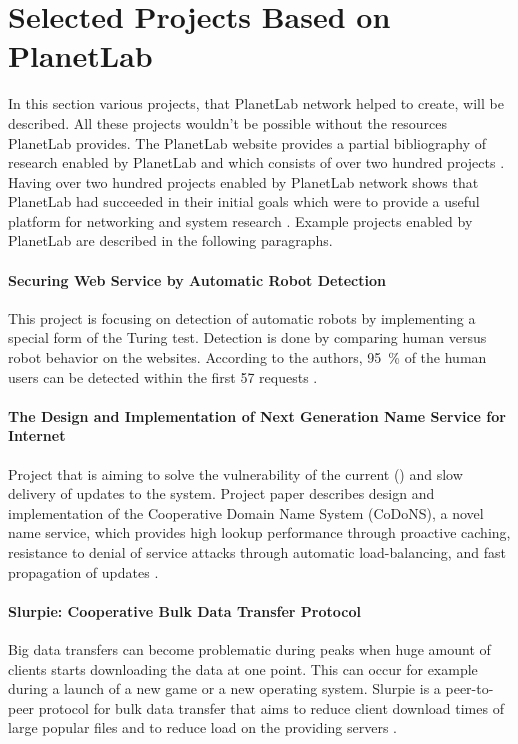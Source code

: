 \section{Selected Projects Based on PlanetLab}
In this section various projects, that PlanetLab network helped to create, will be described. All these projects wouldn't be possible without the resources PlanetLab provides. The PlanetLab website provides a partial bibliography of research enabled by PlanetLab and which consists of over two hundred projects \cite{planetlabmain}. Having over two hundred projects enabled by PlanetLab network shows that PlanetLab had succeeded in their initial goals which were to provide a useful platform for networking and system research \cite{Roscoe_PDN-02-002}. Example projects enabled by PlanetLab are described in the following paragraphs.
\paragraph{Securing Web Service by Automatic Robot Detection}
This project is focusing on detection of automatic robots by implementing a special form of the Turing test. Detection is done by comparing human versus robot behavior on the websites. According to the authors, \SI{95}{\percent} of the human users can be detected within the first 57 requests \cite{Park:2006:SWS:1267359.1267382}.
\paragraph{The Design and Implementation of Next Generation Name Service for Internet}
Project that is aiming to solve the vulnerability of the current  () and slow delivery of updates to the system. Project paper describes design and implementation of the Cooperative Domain Name System (CoDoNS), a novel name service, which provides high lookup performance through proactive caching, resistance to denial of service attacks through automatic load-balancing, and fast propagation of updates \cite{Ramasubramanian:2004:DIN:1030194.1015504}.
\paragraph{Slurpie: Cooperative Bulk Data Transfer Protocol}
Big data transfers can become problematic during peaks when huge amount of clients starts downloading the data at one point. This can occur for example during a launch of a new game or a new operating system. Slurpie is a peer-to-peer protocol for bulk data transfer that aims to reduce client download times of large popular files and to reduce load on the providing servers \cite{1356981}. 

